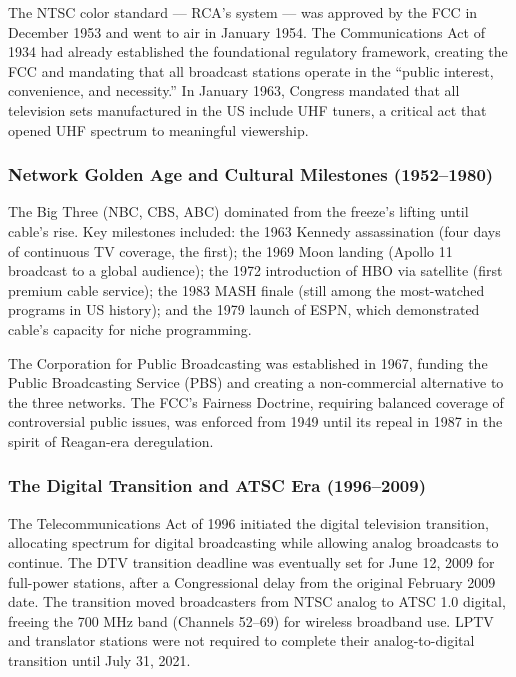 \documentclass[11pt,letterpaper]{article}
\begin{document}
The NTSC color standard --- RCA's system --- was approved by the FCC in December 1953 and went to air in January 1954. The Communications Act of 1934 had already established the foundational regulatory framework, creating the FCC and mandating that all broadcast stations operate in the ``public interest, convenience, and necessity.'' In January 1963, Congress mandated that all television sets manufactured in the US include UHF tuners, a critical act that opened UHF spectrum to meaningful viewership.

\subsubsection{Network Golden Age and Cultural Milestones (1952--1980)}

The Big Three (NBC, CBS, ABC) dominated from the freeze's lifting until cable's rise. Key milestones included: the 1963 Kennedy assassination (four days of continuous TV coverage, the first); the 1969 Moon landing (Apollo 11 broadcast to a global audience); the 1972 introduction of HBO via satellite (first premium cable service); the 1983 MASH finale (still among the most-watched programs in US history); and the 1979 launch of ESPN, which demonstrated cable's capacity for niche programming.

The Corporation for Public Broadcasting was established in 1967, funding the Public Broadcasting Service (PBS) and creating a non-commercial alternative to the three networks. The FCC's Fairness Doctrine, requiring balanced coverage of controversial public issues, was enforced from 1949 until its repeal in 1987 in the spirit of Reagan-era deregulation.

\subsubsection{The Digital Transition and ATSC Era (1996--2009)}

The Telecommunications Act of 1996 initiated the digital television transition, allocating spectrum for digital broadcasting while allowing analog broadcasts to continue. The DTV transition deadline was eventually set for June 12, 2009 for full-power stations, after a Congressional delay from the original February 2009 date. The transition moved broadcasters from NTSC analog to ATSC 1.0 digital, freeing the 700 MHz band (Channels 52--69) for wireless broadband use. LPTV and translator stations were not required to complete their analog-to-digital transition until July 31, 2021.
\end{document}
